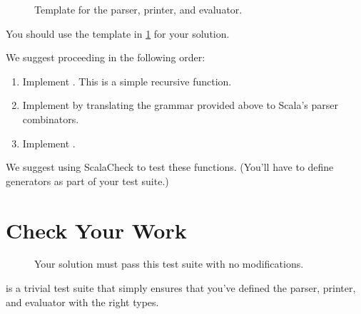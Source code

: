 \begin{figure}
\caption{Template for the parser, printer, and evaluator.}
\label{parsing_template}
\end{figure}

You should use the template in \cref{parsing_template} for your solution.

We suggest proceeding in the following order:

\begin{enumerate}

\item Implement . This is a simple recursive function.

\item Implement  by translating the grammar provided above to Scala's parser combinators.

\item Implement .

\end{enumerate}

We suggest using ScalaCheck to test these functions. (You'll have to define generators as part of your test suite.)

\section{Check Your Work}

\begin{figure}
\caption{Your solution must pass this test suite with no modifications.}
\label{parsing_tests}
\end{figure}

 is a trivial test suite that simply ensures that you've defined the parser, printer, and evaluator with the right types.


